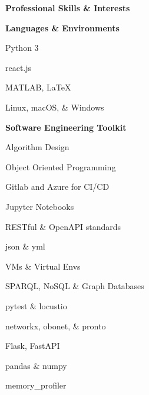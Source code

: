 \documentclass[letterpaper,final]{memoir}
\newcommand{\LargeSep}{\vspace{1.3em}}
\newcommand{\Sep}{\vspace{1.0em}}
\newcommand{\SmallSep}{\vspace{0.4em}}
\newcommand{\CVSection}[1]
	{\LARGE\textbf{#1}\par
	\SmallSep\normalsize}
\newcommand{\CVItem}[1]
	{\textbf{\color{Blue} #1}}
\begin{document}

\notoserif \CVSection{Professional Skills \& Interests}
\normalfont
\LargeSep

\CVItem{Languages \& Environments}
\Sep

\begin{multicols}{1}

    \begin{compactitem}[\color{Blue}$\circ$]

		\item Python 3
        \SmallSep
        \item react.js
        \SmallSep
        \item MATLAB, LaTeX
        \SmallSep
        \item Linux, macOS, \& Windows

	\end{compactitem}

\end{multicols}

\Sep

\CVItem{Software Engineering Toolkit}
\Sep

\begin{multicols}{2}

    \begin{compactitem}[\color{Blue}$\circ$]

        \item Algorithm Design
        \SmallSep
        \item Object Oriented Programming
        \SmallSep
        \item Gitlab and Azure for CI/CD
        \SmallSep
        \item Jupyter Notebooks
        \SmallSep
        \item RESTful \& OpenAPI standards
		\SmallSep
        \item json \& yml
        \SmallSep
        \item VMs \& Virtual Envs
        \SmallSep
        \item SPARQL, NoSQL \& Graph Databases
        \SmallSep
        \item pytest \& locustio
        \SmallSep
        \item networkx, obonet, \& pronto
        \SmallSep
        \item Flask, FastAPI
        \SmallSep
        \item pandas \& numpy
        \SmallSep
        \item memory\_profiler
        \SmallSep

    \end{compactitem}

\end{multicols}
\LargeSep
\end{document}
